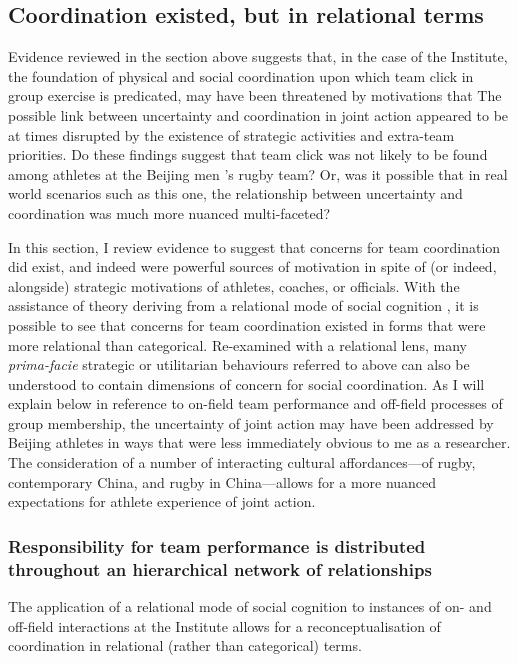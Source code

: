 \begin{CJK}{UTF8}{gbsn}
\subsection{Coordination existed, but in relational terms\label{}}
Evidence reviewed in the section above suggests that, in the case of the Institute, the foundation of physical and social coordination upon which team click in group exercise is predicated, may have been threatened by motivations that  The possible link between uncertainty and coordination in joint action appeared to be at times disrupted by the existence of strategic activities and extra-team priorities.  Do these findings suggest that team click was not likely to be found among athletes at the Beijing men 's rugby team? Or, was it possible that in real world scenarios such as this one, the relationship between uncertainty and coordination was much more nuanced multi-faceted?

In this section, I review evidence to suggest that concerns for team coordination did exist, and indeed were powerful sources of motivation in spite of (or indeed, alongside) strategic motivations of athletes, coaches, or officials.  With the assistance of theory deriving from a relational mode of social cognition \citep{Liu2009}, it is possible to see that concerns for team coordination existed in forms that were more relational than categorical.  Re-examined with a relational lens, many \textit{prima-facie} strategic or utilitarian behaviours referred to above can also be understood to contain dimensions of concern for social coordination.  As I will explain below in reference to on-field team performance and off-field processes of group membership, the uncertainty of joint action may have been addressed by Beijing athletes in ways that were less immediately obvious to me as a researcher.  The consideration of a number of interacting cultural affordances---of rugby, contemporary China, and rugby in China---allows for a more nuanced expectations for athlete experience of joint action.


\subsubsection{Responsibility for team performance is distributed throughout an hierarchical network of relationships\label{sect:relationalPerformance}}
The application of a relational mode of social cognition to instances of on- and off-field interactions at the Institute allows for a reconceptualisation of coordination in relational (rather than categorical) terms.


\end{CJK}
